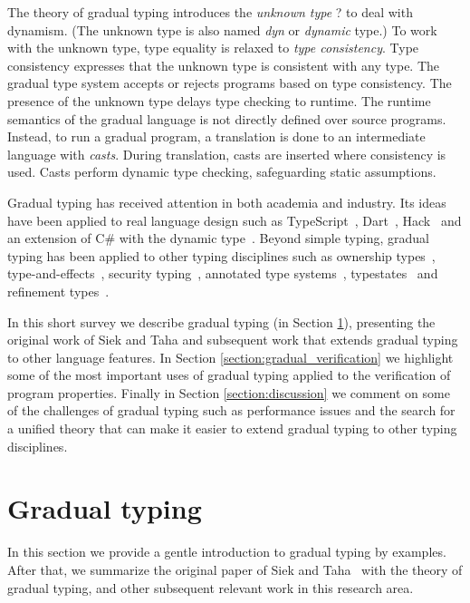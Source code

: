 \documentclass{article}
\begin{document}
The theory of gradual typing introduces the \emph{unknown type} ? to deal with dynamism. (The unknown type is also named \emph{dyn} or \emph{dynamic} type.) To work with the unknown type, type equality is relaxed to \emph{type consistency}. Type consistency expresses that the unknown type is consistent with any type. The gradual type system accepts or rejects programs based on type consistency. The presence of the unknown type delays type checking to runtime. The runtime semantics of the gradual language is not directly defined over source programs. Instead, to run a gradual program, a translation is done to an intermediate language with \emph{casts}. During translation, casts are inserted where consistency is used. Casts perform dynamic type checking, safeguarding static assumptions.

Gradual typing has received attention in both academia and industry. Its ideas have been applied to real language design such as TypeScript~\cite{biermanAt:ecoop2014}, Dart~\cite{dart-spec}, Hack~\cite{hack-spec} and an extension of C\# with the dynamic type~\cite{biermanAl:ecoop2010}. Beyond simple typing, gradual typing has been applied to other typing disciplines such as ownership types~\cite{sergeyClarke:esop2012}, type-and-effects~\cite{banadosAl:icfp2014, toroTanter:oopsla2015}, security typing~\cite{disneyFlanagan:stop2011, fennellThiemann:csf2013}, annotated type systems~\cite{thiemannFennell:esop2014}, typestates~\cite{wolffAl:ecoop2011} and refinement types~\cite{tanterTabareau:dls2015}.

In this short survey we describe gradual typing (in Section \ref{section:gradual_typing}), presenting the original work of Siek and Taha and subsequent work that extends gradual typing to other language features. In Section \ref{section:gradual_verification} we highlight some of the most important uses of gradual typing applied to the verification of program properties. Finally in Section \ref{section:discussion} we comment on some of the challenges of gradual typing such as performance issues and the search for a unified theory that can make it easier to extend gradual typing to other typing disciplines.

\section{Gradual typing}\label{section:gradual_typing}
In this section we provide a gentle introduction to gradual typing by examples. After that, we summarize the original paper of Siek and Taha~\cite{siekTaha:sfp2006} with the theory of gradual typing, and other subsequent relevant work in this research area.
\end{document}
